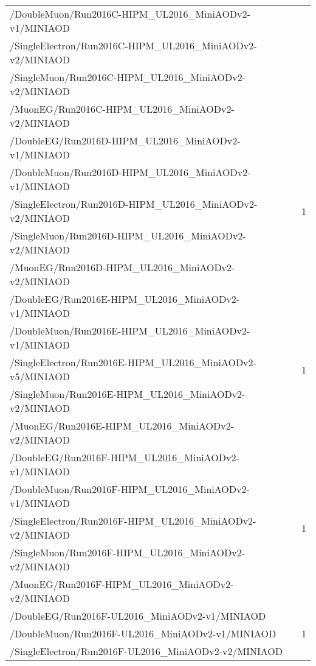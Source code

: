 \begin{table}[h]
\begin{tabular}{|lc|}
        /DoubleMuon/Run2016C-HIPM\_UL2016\_MiniAODv2-v1/MINIAOD	& \\
        /SingleElectron/Run2016C-HIPM\_UL2016\_MiniAODv2-v2/MINIAOD	& \\
        /SingleMuon/Run2016C-HIPM\_UL2016\_MiniAODv2-v2/MINIAOD	& \\
        /MuonEG/Run2016C-HIPM\_UL2016\_MiniAODv2-v2/MINIAOD	& \\
        \hline
        /DoubleEG/Run2016D-HIPM\_UL2016\_MiniAODv2-v1/MINIAOD & \multirow{5}{*}{1} \\  %
        /DoubleMuon/Run2016D-HIPM\_UL2016\_MiniAODv2-v1/MINIAOD	& \\
        /SingleElectron/Run2016D-HIPM\_UL2016\_MiniAODv2-v2/MINIAOD	& \\
        /SingleMuon/Run2016D-HIPM\_UL2016\_MiniAODv2-v2/MINIAOD	& \\
        /MuonEG/Run2016D-HIPM\_UL2016\_MiniAODv2-v2/MINIAOD	& \\
        \hline
        /DoubleEG/Run2016E-HIPM\_UL2016\_MiniAODv2-v1/MINIAOD & \multirow{5}{*}{1} \\  %
        /DoubleMuon/Run2016E-HIPM\_UL2016\_MiniAODv2-v1/MINIAOD	& \\
        /SingleElectron/Run2016E-HIPM\_UL2016\_MiniAODv2-v5/MINIAOD	& \\
        /SingleMuon/Run2016E-HIPM\_UL2016\_MiniAODv2-v2/MINIAOD	& \\
        /MuonEG/Run2016E-HIPM\_UL2016\_MiniAODv2-v2/MINIAOD	& \\
        \hline
        /DoubleEG/Run2016F-HIPM\_UL2016\_MiniAODv2-v1/MINIAOD & \multirow{5}{*}{1} \\  %
        /DoubleMuon/Run2016F-HIPM\_UL2016\_MiniAODv2-v1/MINIAOD	& \\
        /SingleElectron/Run2016F-HIPM\_UL2016\_MiniAODv2-v2/MINIAOD	& \\
        /SingleMuon/Run2016F-HIPM\_UL2016\_MiniAODv2-v2/MINIAOD	& \\
        /MuonEG/Run2016F-HIPM\_UL2016\_MiniAODv2-v2/MINIAOD	& \\
        \hline
        /DoubleEG/Run2016F-UL2016\_MiniAODv2-v1/MINIAOD & \multirow{5}{*}{1} \\  %
        /DoubleMuon/Run2016F-UL2016\_MiniAODv2-v1/MINIAOD	& \\
        /SingleElectron/Run2016F-UL2016\_MiniAODv2-v2/MINIAOD	& \\

\end{tabular}
\end{table}

